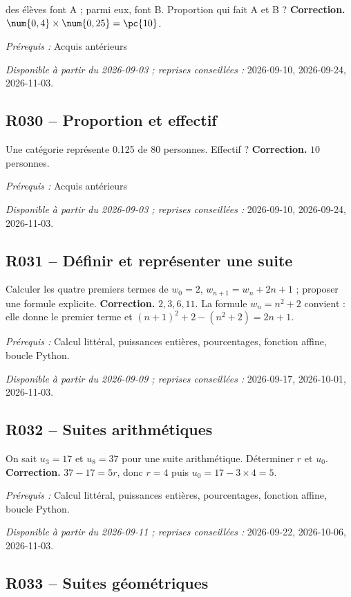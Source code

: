  des élèves font A ; parmi eux,  font B. Proportion qui fait A et B ?
\ifmxteacher\textbf{Correction.} $\num{0,4}\times\num{0,25}=\pc{10}$.\par\textit{Prérequis :} Acquis antérieurs\par\textit{Disponible à partir du 2026-09-03 ; reprises conseillées :} 2026-09-10, 2026-09-24, 2026-11-03.\fi
{}\subsection*{R030 -- Proportion et effectif}\label{R030}
Une catégorie représente \num{0,125} de 80 personnes. Effectif ?
\ifmxteacher\textbf{Correction.} $10$ personnes.\par\textit{Prérequis :} Acquis antérieurs\par\textit{Disponible à partir du 2026-09-03 ; reprises conseillées :} 2026-09-10, 2026-09-24, 2026-11-03.\fi
{}\subsection*{R031 -- Définir et représenter une suite}\label{R031}
Calculer les quatre premiers termes de $w_0=2$, $w_{n+1}=w_n+2n+1$ ; proposer une formule explicite.
\ifmxteacher\textbf{Correction.} $2,3,6,11$. La formule $w_n=n^2+2$ convient : elle donne le premier terme et $(n+1)^2+2-(n^2+2)=2n+1$.\par\textit{Prérequis :} Calcul littéral, puissances entières, pourcentages, fonction affine, boucle Python.\par\textit{Disponible à partir du 2026-09-09 ; reprises conseillées :} 2026-09-17, 2026-10-01, 2026-11-03.\fi
{}\subsection*{R032 -- Suites arithmétiques}\label{R032}
On sait $u_3=17$ et $u_8=37$ pour une suite arithmétique. Déterminer $r$ et $u_0$.
\ifmxteacher\textbf{Correction.} $37-17=5r$, donc $r=4$ puis $u_0=17-3\times4=5$.\par\textit{Prérequis :} Calcul littéral, puissances entières, pourcentages, fonction affine, boucle Python.\par\textit{Disponible à partir du 2026-09-11 ; reprises conseillées :} 2026-09-22, 2026-10-06, 2026-11-03.\fi
{}\subsection*{R033 -- Suites géométriques}\label{R033}
